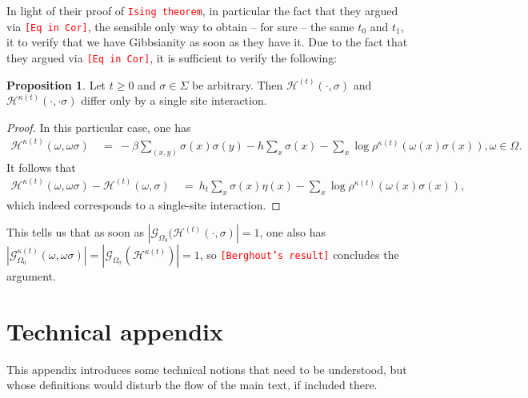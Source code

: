 \documentclass[12pt]{article}
\newcommand{\G}{\mathcal{G}}
\renewcommand{\H}{\mathcal{H}}
\newcommand{\pika}{\boldsymbol{\cdot}}
\newcommand{\1}{\mathbbm{1}}
\newcommand{\5}{\vspace{0.5cm}}
\theoremstyle{definition}
\newtheorem{prop}[thm]{Proposition}
\begin{document}
In light of their proof of \textcolor{red}{\textcolor{red}{\texttt{Ising theorem}}}, in particular the fact that they argued via \textcolor{red}{\texttt{[Eq in Cor]}}, the sensible only way to obtain -- for sure -- the same $t_0$ and $t_1$, it to verify that we have Gibbsianity as soon as they have it. Due to the fact that they argued via \textcolor{red}{\texttt{[Eq in Cor]}}, it is sufficient to verify the following:
\begin{prop} Let $t\geq 0$ and $\sigma\in\Sigma$ be arbitrary. Then $\H^{(t)}(\pika,\sigma)$ and $\H^{\kappa(t)}(\pika,\pika\sigma)$ differ only by a single site interaction.
\end{prop}
\begin{proof}
In this particular case, one has
\begin{align*}
\H^{\kappa(t)}(\omega,\omega\sigma) ~&=~ -\beta\sum_{(x,y)}\sigma(x)\sigma(y) - h\sum_{x}\sigma(x) -\sum_{x}\log\rho^{\kappa(t)}(\omega(x)\sigma(x)), \omega\in\Omega.
\end{align*}
It follows that
\begin{align*}
\H^{\kappa(t)}(\omega,\omega\sigma) - \H^{(t)}(\omega,\sigma) ~&=~ h_t\sum_{x}\sigma(x)\eta(x) - \sum_{x}\log\rho^{\kappa(t)}(\omega(x)\sigma(x)),
\end{align*}
which indeed corresponds to a single-site interaction.
\end{proof}

This tells us that as soon as $|\G_{\Omega_0}(\H^{(t)}(\pika,\sigma)|=1$, one also has $|\G_{\Omega_0}^{\kappa(t)}(\omega,\omega\sigma)|=|\G_{\Omega_\sigma}(\H^{\kappa(t)})|=1$, so \textcolor{red}{\texttt{[Berghout's result]}} concludes the argument.

\pagebreak



\appendix

\section{Technical appendix}

This appendix introduces some technical notions that need to be understood, but whose definitions would disturb the flow of the main text, if included there.
\end{document}
